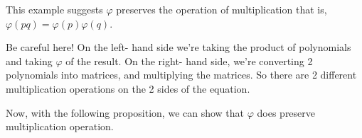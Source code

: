 This example suggests $\varphi$ preserves the operation of multiplication that is,
$ \varphi(pq) = \varphi(p)\varphi(q)$.

Be careful here! On the left- hand side we're taking the product of polynomials and taking $\varphi$ of the result. On the right- hand side, we're converting 2 polynomials into matrices, and multiplying the matrices.
So there are 2 different multiplication operations on the 2 sides of the equation.
%



%
%
%

Now, with the following proposition, we can show that $\varphi$ does preserve multiplication operation.

